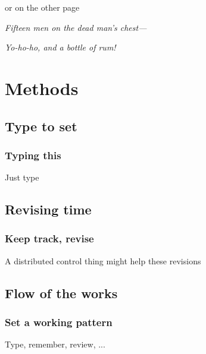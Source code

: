 \documentclass[pdf]{beamer}
\begin{document}
\begin{frame}{or on the other page}

  {\hfil\sl{}Fifteen men on the dead man's chest---}

             {\hfil\sl{}Yo-ho-ho, and a bottle of rum!}
\end{frame}

\section{Methods}
\subsection{Type to set}

\begin{frame}
  \frametitle{Typing this}
    Just type
\end{frame}

\subsection{Revising time}

\begin{frame}
  \frametitle{Keep track, revise}
    A distributed control thing might help these revisions
\end{frame}

\subsection{Flow of the works}

\begin{frame}
  \frametitle{Set a working pattern}
    Type, remember, review, ...
\end{frame}
\end{document}

